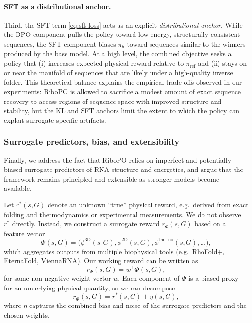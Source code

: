 {{\paragraph{SFT as a distributional anchor.}
Third, the SFT term \eqref{eq:sft-loss} acts as an explicit
\emph{distributional anchor}. While the DPO component pulls the policy toward
low-energy, structurally consistent sequences, the SFT component biases
$\pi_\theta$ toward sequences similar to the winners produced by the base
model. At a high level, the combined objective seeks a policy that (i)
increases expected physical reward relative to $\pi_{\text{ref}}$ and (ii)
stays on or near the manifold of sequences that are likely under a
high-quality inverse folder. This theoretical balance explains the
empirical trade-offs observed in our experiments: RiboPO is allowed to
sacrifice a modest amount of exact sequence recovery to access regions of
sequence space with improved structure and stability, but the KL and SFT
anchors limit the extent to which the policy can exploit surrogate-specific
artifacts.

\subsubsection{Surrogate predictors, bias, and extensibility}

Finally, we address the fact that RiboPO relies on imperfect and potentially
biased surrogate predictors of RNA structure and energetics, and argue that
the framework remains principled and extensible as stronger models become
available.

Let $r^*(s, G)$ denote an unknown ``true'' physical reward, e.g.\ derived
from exact folding and thermodynamics or experimental measurements. We do
not observe $r^*$ directly. Instead, we construct a surrogate reward
$r_\Phi(s, G)$ based on a feature vector
\begin{equation}
    \Phi(s, G)
    =
    \bigl(
        \phi^{\text{3D}}(s, G),
        \phi^{\text{2D}}(s, G),
        \phi^{\text{thermo}}(s, G),
        \dots
    \bigr),
\end{equation}
which aggregates outputs from multiple biophysical tools (e.g.\ RhoFold+,
EternaFold, ViennaRNA).
Our working reward can be written as
\begin{equation}
    r_\Phi(s, G) = w^\top \Phi(s, G),
    \label{eq:surrogate-reward}
\end{equation}
for some non-negative weight vector $w$. Each component of $\Phi$ is a
biased proxy for an underlying physical quantity, so we can decompose
\begin{equation}
    r_\Phi(s, G)
    =
    r^*(s, G) + \eta(s, G),
    \label{eq:reward-bias}
\end{equation}
where $\eta$ captures the combined bias and noise of the surrogate predictors
and the chosen weights.

}}
